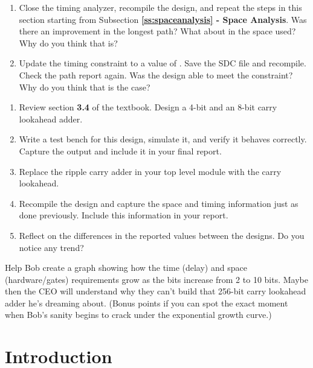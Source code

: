 \documentclass[12pt]{labmanual}
\begin{document}
\begin{questionssection}
\begin{question}
\end{question}
\begin{question}[Improvement]
\begin{enumerate}
    \item Close the timing analyzer, recompile the design, and repeat the steps in this section starting from Subsection \textbf{\ref{ss:spaceanalysis} - Space Analysis}. Was there an improvement in the longest path? What about in the space used? Why do you think that is?
    \item Update the timing constraint to a value of . Save the SDC file and recompile. Check the path report again. Was the design able to meet the constraint? Why do you think that is the case?
\end{enumerate}
    
\end{question}
\begin{question}
\begin{enumerate}
    \item Review section \textbf{3.4} of the textbook. Design a 4-bit and an 8-bit carry lookahead adder.
    \item Write a test bench for this design, simulate it, and verify it behaves correctly. Capture the output and include it in your final report.
    \item Replace the ripple carry adder in your top level module with the carry lookahead.
    \item Recompile the design and capture the space and timing information just as done previously. Include this information in your report.
    \item Reflect on the differences in the reported values between the designs. Do you notice any trend?
\end{enumerate}
\end{question}
\begin{bonusquestion}
Help Bob create a graph showing how the time (delay) and space (hardware/gates) requirements grow as the bits increase from 2 to 10 bits. Maybe then the CEO will understand why they can't build that 256-bit carry lookahead adder he's dreaming about. (Bonus points if you can spot the exact moment when Bob's sanity begins to crack under the exponential growth curve.)
\end{bonusquestion}
\end{questionssection}
\clearpage
\section{Introduction}
\end{document}
